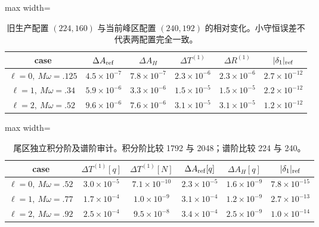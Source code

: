 \begin{table}[htbp]
\centering
\caption{旧生产配置 $(224,160)$ 与当前峰区配置 $(240,192)$ 的相对变化。小守恒误差不代表两配置完全一致。}
\label{note-tab:production-convergence}
\begin{adjustbox}{max width=\textwidth}
\begin{tabular}{c c c c c c}
case & $\Delta A_{\rm ref}$ & $\Delta A_H$
& $\Delta T^{(1)}$ & $\Delta R^{(1)}$ & $|\delta_1|_{\rm ref}$\\
\hline
$\ell=0,\ M\omega=.125$ & $4.5\times10^{-7}$ & $7.8\times10^{-7}$
& $2.3\times10^{-6}$ & $2.3\times10^{-6}$ & $2.7\times10^{-12}$\\
$\ell=1,\ M\omega=.34$ & $5.9\times10^{-6}$ & $3.3\times10^{-6}$
& $1.5\times10^{-5}$ & $1.5\times10^{-5}$ & $2.2\times10^{-12}$\\
$\ell=2,\ M\omega=.52$ & $9.6\times10^{-6}$ & $7.6\times10^{-6}$
& $3.1\times10^{-5}$ & $3.1\times10^{-5}$ & $1.2\times10^{-12}$\\
\end{tabular}
\end{adjustbox}
\end{table}

\begin{table}[htbp]
\centering
\caption{尾区独立积分阶及谱阶审计。积分阶比较 1792 与 2048；谱阶比较 224 与 240。}
\label{note-tab:tail-convergence}
\begin{adjustbox}{max width=\textwidth}
\begin{tabular}{c c c c c c}
case & $\Delta T^{(1)}[q]$ & $\Delta T^{(1)}[N]$
& $\Delta A_{\rm ref}[q]$ & $\Delta A_H[q]$ & $|\delta_1|_{\rm ref}$\\
\hline
$\ell=0,\ M\omega=.52$ & $3.0\times10^{-5}$ & $7.1\times10^{-10}$ & $2.3\times10^{-5}$ & $1.6\times10^{-9}$ & $7.8\times10^{-15}$\\
$\ell=1,\ M\omega=.77$ & $1.7\times10^{-4}$ & $1.0\times10^{-9}$ & $3.1\times10^{-4}$ & $1.2\times10^{-9}$ & $2.7\times10^{-13}$\\
$\ell=2,\ M\omega=.92$ & $2.5\times10^{-4}$ & $9.5\times10^{-8}$ & $3.4\times10^{-4}$ & $2.5\times10^{-9}$ & $1.0\times10^{-14}$\\
\end{tabular}
\end{adjustbox}
\end{table}

